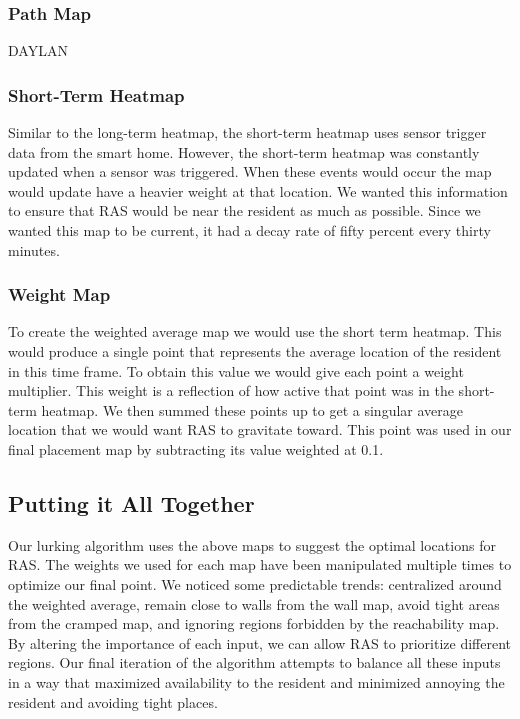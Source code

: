 \documentclass[11pt, conference, a4paper]{IEEEtran}
\begin{document}
\subsubsection{Path Map}
DAYLAN


\subsubsection{Short-Term Heatmap}
Similar to the long-term heatmap, the short-term heatmap uses sensor trigger data from the smart home. However, the short-term heatmap was constantly updated when a sensor was triggered. When these events would occur the map would update have a heavier weight at that location. We wanted this information to ensure that RAS would be near the resident as much as possible. Since we wanted this map to be current, it had a decay rate of fifty percent every thirty minutes. 


\subsubsection{Weight Map}
To create the weighted average map we would use the short term heatmap. This would produce a single point that represents the average location of the resident in this time frame. To obtain this value we would give each point a weight multiplier. This weight is a reflection of how active that point was in the short-term heatmap. We then summed these points up to get a singular average location that we would want RAS to gravitate toward. This point was used in our final placement map by subtracting its value weighted at 0.1. 


\subsection{Putting it All Together}
Our lurking algorithm uses the above maps to suggest the optimal locations for RAS. The weights we used for each map have been manipulated multiple times to optimize our final point. We noticed some predictable trends: centralized around the weighted average, remain close to walls from the wall map, avoid tight areas from the cramped map, and ignoring regions forbidden by the reachability map. By altering the importance of each input, we can allow RAS to prioritize different regions. Our final iteration of the algorithm attempts to balance all these inputs in a way that maximized availability to the resident and minimized annoying the resident and avoiding tight places.
\end{document}
